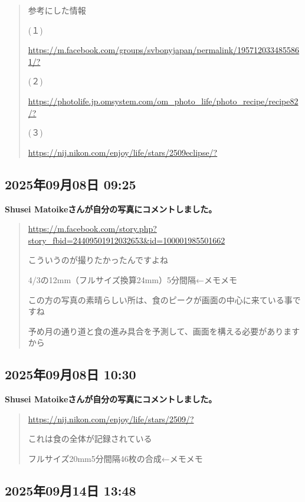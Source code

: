 \begin{quote}
参考にした情報

(１)

\url{https://m.facebook.com/groups/svbonyjapan/permalink/1957120334855861/?}

(２)

\url{https://photolife.jp.omsystem.com/om_photo_life/photo_recipe/recipe82/?}

(３)

\url{https://nij.nikon.com/enjoy/life/stars/2509eclipse/?}
\end{quote}

\subsection*{2025年09月08日 09:25}

\textbf{Shusei Matoikeさんが自分の写真にコメントしました。}

\begin{quote}
\url{https://m.facebook.com/story.php?story_fbid=24409501912032653&id=100001985501662}

こういうのが撮りたかったんですよね

4/3の12mm（フルサイズ換算24mm）5分間隔←メモメモ

この方の写真の素晴らしい所は、食のピークが画面の中心に来ている事ですね

予め月の通り道と食の進み具合を予測して、画面を構える必要がありますから
\end{quote}

\subsection*{2025年09月08日 10:30}

\textbf{Shusei Matoikeさんが自分の写真にコメントしました。}

\begin{quote}
\url{https://nij.nikon.com/enjoy/life/stars/2509/?}

これは食の全体が記録されている

フルサイズ20mm5分間隔46枚の合成←メモメモ
\end{quote}

\subsection*{2025年09月14日 13:48}


